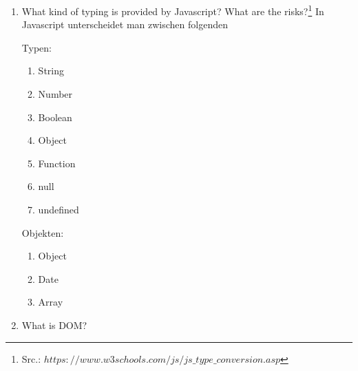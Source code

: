 \documentclass[11pt]{article}
\begin{document}
\begin{enumerate}[\thesection .1]
        \item What kind of typing is provided by Javascript? What are the risks?\footnote[2]{Src.: $https://www.w3schools.com/js/js\_type\_conversion.asp$}
        In Javascript unterscheidet man zwischen folgenden
        \begin{addmargin}[1em]{1em}
            Typen:
            \begin{enumerate}[$\circ$]
                \item String
                \item Number
                \item Boolean
                \item Object
                \item Function
                \item null
                \item undefined
            \end{enumerate}

            Objekten:
            \begin{enumerate}[$\circ$]
                \item Object
                \item Date
                \item Array
            \end{enumerate}




        \end{addmargin}



        \item What is DOM?

    \end{enumerate}
\end{document}
